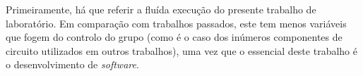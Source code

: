 





Primeiramente, há que referir a fluída execução do presente trabalho de laboratório. Em comparação com trabalhos passados, este tem menos variáveis que fogem do controlo do grupo (como é o caso dos inúmeros componentes de circuito utilizados em outros trabalhos), uma vez que o essencial deste trabalho é o desenvolvimento de \textit{software}. \newline

